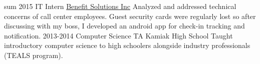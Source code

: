 \documentclass[]{friggeri-cv}
\begin{document}
\begin{entrylist}
  \entry
    {sum 2015}
    {IT Intern}
    {\href{http://www.bsitpa.com/}{Benefit Solutions Inc}}
    {Analyzed and addressed technical concerns of call center employees. Guest security cards were regularly lost so after discussing with my boss, I developed an android app for check-in tracking and notification.}
  \entry
    {2013-2014}
    {Computer Science TA}
    {Kamiak High School}
    {Taught introductory computer science to high schoolers alongside industry professionals (TEALS program).}
\end{entrylist}






%
\end{document}
